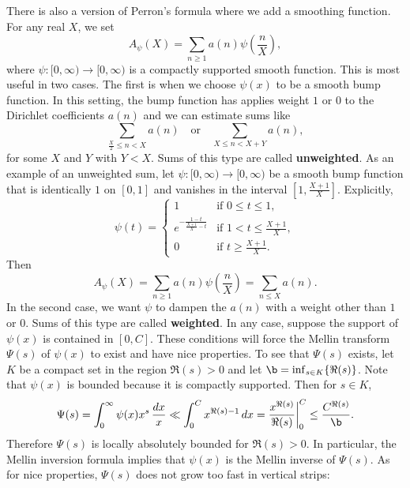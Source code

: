     There is also a version of Perron's formula where we add a smoothing function. For any real $X$, we set
    \[
      A_{\psi}(X) = \sum_{n \ge 1}a(n)\psi\left(\frac{n}{X}\right),
    \]
    where $\psi:[0,\infty) \to [0,\infty)$ is a compactly supported smooth function. This is most useful in two cases. The first is when we choose $\psi(x)$ to be a smooth bump function. In this setting, the bump function has applies weight $1$ or $0$ to the Dirichlet coefficients $a(n)$ and we can estimate sums like
    \[
      \sum_{\frac{X}{2} \le n < X}a(n) \quad \text{or} \quad \sum_{X \le n < X+Y}a(n),
    \]
    for some $X$ and $Y$ with $Y < X$. Sums of this type are called \textbf{unweighted}. As an example of an unweighted sum, let $\psi:[0,\infty) \to [0,\infty)$ be a smooth bump function that is identically $1$ on $[0,1]$ and vanishes in the interval $\left[1,\frac{X+1}{X}\right]$. Explicitly,
    \[
      \psi(t) = \begin{cases} 1 & \text{if $0 \le t \le 1$}, \\ e^{-\frac{1-t}{\frac{X+1}{X}-t}} & \text{if $1 < t \le \frac{X+1}{X}$}, \\ 0 & \text{if $t \ge \frac{X+1}{X}$}. \end{cases}
    \]
    Then 
    \[
      A_{\psi}(X) = \sum_{n \ge 1}a(n)\psi\left(\frac{n}{X}\right) = \sum_{n \le X}a(n).
    \]
    In the second case, we want $\psi$ to dampen the $a(n)$ with a weight other than $1$ or $0$. Sums of this type are called \textbf{weighted}. In any case, suppose the support of $\psi(x)$ is contained in $[0,C]$. These conditions will force the Mellin transform $\Psi(s)$ of $\psi(x)$ to exist and have nice properties. To see that $\Psi(s)$ exists, let $K$ be a compact set in the region $\Re(s) > 0$ and let $\b = \inf_{s \in K}\{\Re(s)\}$. Note that $\psi(x)$ is bounded because it is compactly supported. Then for $s \in K$,
    \[
      \Psi(s) = \int_{0}^{\infty}\psi(x)x^{s}\,\frac{dx}{x} \ll \int_{0}^{C}x^{\Re(s)-1}\,dx = \frac{x^{\Re(s)}}{\Re(s)}\bigg|_{0}^{C} \le \frac{C^{\Re(s)}}{\b}.
    \]
    Therefore $\Psi(s)$ is locally absolutely bounded for $\Re(s) > 0$. In particular, the Mellin inversion formula implies that $\psi(x)$ is the Mellin inverse of $\Psi(s)$. As for nice properties, $\Psi(s)$ does not grow too fast in vertical strips:

